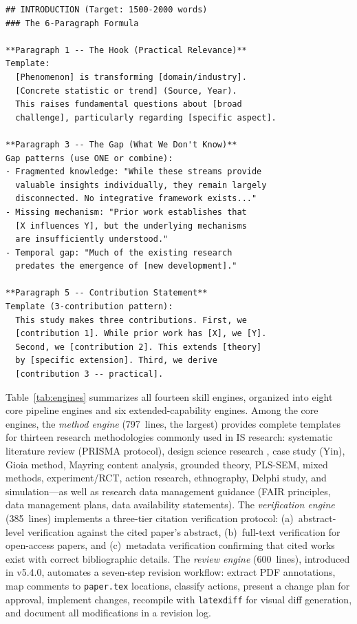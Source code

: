 \documentclass{article}
\begin{document}
\begin{lstlisting}[caption={Excerpt from \texttt{writing-engine/SKILL.md}: the six-paragraph introduction formula with fill-in-the-blank templates. Bracketed placeholders are instantiated by the LLM for each paper; the structural conventions (paragraph roles, gap patterns, contribution format) are fixed.},label={lst:skill},float=t]
## INTRODUCTION (Target: 1500-2000 words)
### The 6-Paragraph Formula

**Paragraph 1 -- The Hook (Practical Relevance)**
Template:
  [Phenomenon] is transforming [domain/industry].
  [Concrete statistic or trend] (Source, Year).
  This raises fundamental questions about [broad
  challenge], particularly regarding [specific aspect].

**Paragraph 3 -- The Gap (What We Don't Know)**
Gap patterns (use ONE or combine):
- Fragmented knowledge: "While these streams provide
  valuable insights individually, they remain largely
  disconnected. No integrative framework exists..."
- Missing mechanism: "Prior work establishes that
  [X influences Y], but the underlying mechanisms
  are insufficiently understood."
- Temporal gap: "Much of the existing research
  predates the emergence of [new development]."

**Paragraph 5 -- Contribution Statement**
Template (3-contribution pattern):
  This study makes three contributions. First, we
  [contribution 1]. While prior work has [X], we [Y].
  Second, we [contribution 2]. This extends [theory]
  by [specific extension]. Third, we derive
  [contribution 3 -- practical].
\end{lstlisting}

Table~\ref{tab:engines} summarizes all fourteen skill engines, organized into eight core pipeline engines and six extended-capability engines. Among the core engines, the \emph{method engine} (797~lines, the largest) provides complete templates for thirteen research methodologies commonly used in IS research: systematic literature review (PRISMA protocol), design science research \citep{peffers2007dsrm}, case study (Yin), Gioia method, Mayring content analysis, grounded theory, PLS-SEM, mixed methods, experiment/RCT, action research, ethnography, Delphi study, and simulation---as well as research data management guidance (FAIR principles, data management plans, data availability statements). The \emph{verification engine} (385~lines) implements a three-tier citation verification protocol: (a)~abstract-level verification against the cited paper's abstract, (b)~full-text verification for open-access papers, and (c)~metadata verification confirming that cited works exist with correct bibliographic details. The \emph{review engine} (600~lines), introduced in v5.4.0, automates a seven-step revision workflow: extract PDF annotations, map comments to \texttt{paper.tex} locations, classify actions, present a change plan for approval, implement changes, recompile with \texttt{latexdiff} for visual diff generation, and document all modifications in a revision log.
\end{document}
